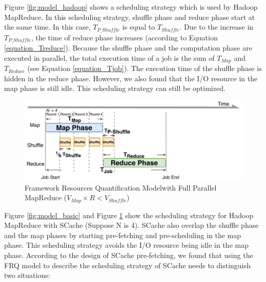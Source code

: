 {Figure \ref{fig:model_hadoop} shows a scheduling strategy which is used by Hadoop MapReduce. In this scheduling strategy, shuffle phase and reduce phase start at the same time. In this case, \(T_{P\_Shuffle}\) is equal to \(T_{Shuffle}\). Due to the increase in \(T_{P\_Shuffle}\), the time of reduce phase increases (according to Equation \ref{equation_Treduce}). Because the shuffle phase and the computation phase are executed in parallel, the total execution time of a job is the sum of \(T_{Map}\) and \(T_{Reduce}\) (see Equation \ref{equation_Tjob}). The execution time of the shuffle phase is hidden in the reduce phase. 
However, we also found that the I/O resource in the map phase is still idle. This scheduling strategy can still be optimized.

\begin{figure}
	\centering
	\includegraphics[width=\linewidth]{fig/model_scache2}
	\caption{\color{black}Framework Resources Quantification Model\newline with Full Parallel MapReduce (\(V_{Map} \times R < V_{Shuffle}\))}
	\label{fig:model_scache2}
\end{figure}

Figure \ref{fig:model_basic} and Figure \ref{fig:model_scache2} show the scheduling strategy for Hadoop MapReduce with SCache (Suppose N is 4).
SCache also overlap the shuffle phase and the map phases by starting pre-fetching and pre-scheduling in the map phase.
This scheduling strategy avoids the I/O resource being idle in the map phase.
According to the design of SCache pre-fetching, we found that using the FRQ model to describe the scheduling strategy of SCache needs to distinguish two situations:

}
